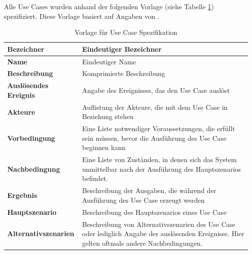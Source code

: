 Alle Use Cases wurden anhand der folgenden Vorlage (siehe Tabelle \ref{table:use_case_template}) spezifiziert. Diese Vorlage basiert auf Angaben von \cite{req_eng_book}.

\begin{table}[ht]
\centering
  \begin{tabular}{ l | p{10cm} }
	\hline
	\rowcolor{gray}
	\textbf{Bezeichner}&	\textbf{Eindeutiger Bezeichner}\\ \hline
	\textbf{Name}		&	Eindeutiger Name\\ \hline
	\textbf{Beschreibung}	&	Komprimierte Beschreibung\\ \hline
	\textbf{Auslösendes Ereignis} &	Angabe des Ereignisses, das den Use Case auslöst\\ \hline
	\textbf{Akteure}		&	Auflistung der Akteure, die mit dem Use Case in Beziehung stehen\\ \hline
	\textbf{Vorbedingung}	&	Eine Liste notwendiger Voraussetzungen, die erfüllt sein müssen, bevor die Ausführung des Use Case beginnen kann\\ \hline
	\textbf{Nachbedingung}	&	Eine Liste von Zuständen, in denen sich das System unmittelbar nach der Ausführung des Hauptszenarios befindet.\\ \hline
	\textbf{Ergebnis}		&	Beschreibung der Ausgaben, die während der Ausführung des Use Case erzeugt werden\\ \hline
	\textbf{Hauptszenario}	&	Beschreibung des Hauptszenarios eines Use Case\\ \hline
	\textbf{Alternativszenarien}	&	Beschreibung von Alternativszenarien des Use Case oder lediglich Angabe der auslösenden Ereignisse. 
					Hier gelten oftmals andere Nachbedingungen.\\ \hline
  \end{tabular}
   \caption{Vorlage für Use Case Spezifikation}\label{table:use_case_template}
\end{table}

